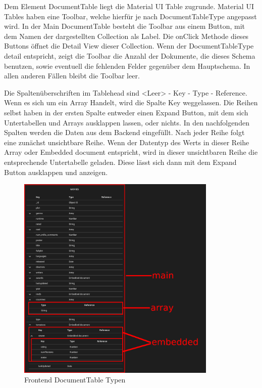 Dem Element DocumentTable liegt die Material UI Table zugrunde.
Material UI Tables haben eine Toolbar, welche hierfür je nach DocumentTableType angepasst wird.
In der Main DocumentTable besteht die Toolbar aus einem Button, mit dem Namen der dargestellten Collection als Label.
Die onClick Methode dieses Buttons öffnet die Detail View dieser Collection.
Wenn der DocumentTableType detail entspricht, zeigt die Toolbar die Anzahl der Dokumente, die dieses Schema benutzen, sowie eventuell die fehlenden Felder gegenüber dem Hauptschema.
In allen anderen Fällen bleibt die Toolbar leer.

Die Spaltenüberschriften im Tablehead sind <Leer> - Key - Type - Reference.
Wenn es sich um ein Array Handelt, wird die Spalte Key weggelassen.
Die Reihen selbst haben in der ersten Spalte entweder einen Expand Button, mit dem sich Untertabellen und Arrays ausklappen lassen, oder nichts.
In den nachfolgenden Spalten werden die Daten aus dem Backend eingefüllt.
Nach jeder Reihe folgt eine zunächst unsichtbare Reihe.
Wenn der Datentyp des Werts in dieser Reihe Array oder Embedded document entspricht, wird in dieser unsichtbaren Reihe die entsprechende Untertabelle geladen.
Diese lässt sich dann mit dem Expand Button ausklappen und anzeigen.

\begin{figure}[H]
    \includegraphics[width=360]{images/table_types}
    \caption{Frontend DocumentTable Typen}
    \label{fig:table_types}
\end{figure}

